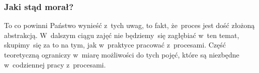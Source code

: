 \documentclass[10pt,t]{beamer}
\begin{document}
\begin{frame}
  \frametitle{Jaki stąd morał?}


  To co powinni Państwo wynieść z~tych uwag, to fakt, że~proces jest dość
  złożoną abstrakcją. W~dalszym ciągu zajęć nie będziemy~się zagłębiać
  w~ten temat, skupimy~się za to na tym, jak w~praktyce pracować
  z~procesami. Część teoretyczną ograniczy w~miarę możliwości do tych
  pojęć, które są niezbędne w~codziennej pracy z~procesami.

\end{frame}



































\end{document}

